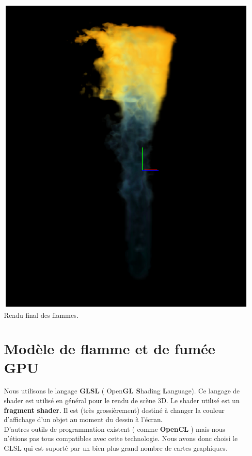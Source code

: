 \documentclass[a4paper,10pt]{article}
\begin{document}
\begin{center}
	\includegraphics[scale=0.6]{FlammeBleue2.ps}\\
	Rendu final des flammes.
    \end{center}  




\newpage
\section{Modèle de flamme et de fumée GPU}

Nous utilisons le langage \textbf{GLSL} ( Open\textbf{GL S}hading
\textbf{L}anguage).  Ce langage de shader est utilisé en général pour
le rendu de scène 3D. Le shader utilisé est un \textbf{fragment
  shader}.  Il est (très grossièrement) destiné à changer la couleur
d'affichage d'un objet au moment du dessin à l'écran.\\ 
D'autres outils de programmation existent (
comme \textbf{OpenCL} ) mais nous n'étions pas tous compatibles avec cette
technologie.  Nous avons donc choisi le GLSL qui est suporté par un
bien plus grand nombre de cartes graphiques.\\
\end{document}
